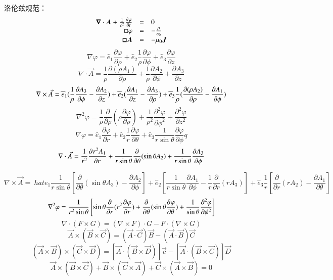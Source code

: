 \documentclass[UTF8,9pt]{ctexart}
\begin{document}
洛伦兹规范：
$$\ar[rcl]{
    \bm{\nabla}\cdot\bm{A}+\ff{c^2}\pt{\varphi}&=&0\\
    \square \varphi&=&-\f{\rho}{\epsilon_0}\\
    \bm{\square A}&=&-\mu_0\bm{J}
}$$
$$\nabla \varphi = \hat e_1 \frac { \partial \varphi } { \partial \rho } + \hat e_2 \frac { 1 } { \rho } \frac { \partial \varphi } { \partial \phi } + \hat { e } _ { 3 } \frac { \partial \varphi } { \partial z }$$
$$\nabla \cdot \vec { A } = \frac { 1 } { \rho } \frac { \partial ( \rho A _ { 1 } ) } { \partial \rho } + \frac { 1 } { \rho } \frac { \partial A _ { 2 } } { \partial \phi } + \frac { \partial A _ { 3 } } { \partial z }$$
$$ { \nabla \times \vec { A } } =\hat e_1 (\ff{\rho} \frac { \partial A_3} { \partial \phi } - \frac { \partial A _ { 2 } } { \partial z } ) + \hat { e } _ { 2 } ( \frac { \partial A _ { 1 } } { \partial z } - \frac { \partial A _ { 3 } } { \partial \rho } ) + \hat { e } _ { 3 } \frac { 1 } { \rho } ( \frac { \partial ( \rho A _ { 2 } ) } { \partial \rho } - \frac { \partial A _ { 1 } } { \partial \phi } )$$
$$\nabla ^ { 2 } \varphi = \frac { 1 } { \rho } \frac { \partial } { \partial \rho } ( \rho \frac { \partial \varphi } { \partial \rho } ) + \frac { 1 } { \rho ^ { 2 } } \frac { \partial ^ { 2 } \varphi } { \partial \phi ^ { 2 } } + \frac { \partial ^ { 2 } \varphi } { \partial z ^ { 2 } }$$
$$\nabla \varphi = \hat { e } _ { 1 } \frac { \partial \varphi } { \partial r } + \hat { e } _ { 2 } \frac { 1 } { r } \frac { \partial \varphi } { \partial \theta } + \hat { e } _ { 3 } \frac { 1 } { r \sin \theta } \frac { \partial \varphi } { \partial \phi }q$$
$$\nabla \cdot \vec { A } = \ff{r^2} \pp{r^2A_1}{r} + \frac { 1 } { r \sin \theta } \frac { \partial } { \partial \theta } ( \sin \theta A _ { 2 } ) + \frac { 1 } { r \sin \theta } \frac { \partial A _ { 3 } } { \partial \phi }$$

$$\nabla \times \vec { A }  = \
hat { e } _ { 1 } \frac { 1 } { r \sin \theta } \left[ \frac { \partial } { \partial \theta } ( \sin \theta A _ { 3 } ) - \frac { \partial A _ { 2 } } { \partial \phi } \right]  
+ \hat { e } _ { 2 } \left[ \frac { 1 } { r \sin \theta } \frac { \partial A _ { 1 } } { \partial \phi } - \frac { 1 } { r } \frac { \partial } { \partial r } ( r A _ { 3 } ) \right] 
+ \hat { e } _ { 3 } \frac { 1 } { r } \left[ \frac { \partial } { \partial r } ( r A _ { 2 } ) - \frac { \partial A _ { 1 } } { \partial \theta } \right] $$
$$\nabla^2\varphi=\ff{r^2\sin\t}\left[\sin\t\pp{}{r}(r^2\pp{\varphi}{r})+\pp{}{\t}(\sin\t\pp{\varphi}{\t})+\ff{\sin\t}\pp[2]{\varphi}{\phi}\right]$$
\sub{Vector Trans}
$$\nabla\cdot(F\times G)=(\nabla\times F)\cdot G-F\cdot(\nabla\times G)$$
$$\vec{A}\times(\vec{B}\times\vec{C})=(\vec{A}\cdot\vec{C})\vec{B}-(\vec{A}\cdot\vec{B})\vec{C}$$
$$( \vec { A } \times \vec { B } ) \times ( \vec { C } \times \vec { D } ) = [ \vec { A } \cdot ( \vec { B } \times \vec { D } ) ] \vec { c } - [ \vec { A } \cdot ( \vec { B } \times \vec { C } ) ] \vec { D }$$
$$\vec { A } \times ( \vec { B } \times \vec { C } ) + \vec { B } \times ( \vec { C } \times \vec { A } ) + \vec { C } \times ( \vec { A } \times \vec { B } ) = 0$$
\end{document}
